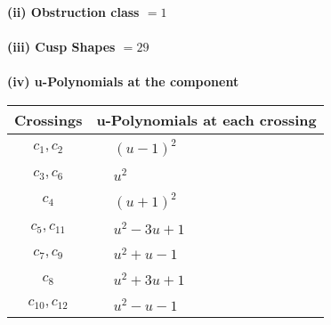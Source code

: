 \documentclass[1p]{elsarticle_modified}
\theoremstyle{definition}
\begin{document}
\flushleft \textbf{(ii) Obstruction class $= 1$}\\~\\
\flushleft \textbf{(iii) Cusp Shapes $= 29$}\\~\\
\newpage\renewcommand{\arraystretch}{1}
\flushleft \textbf{(iv) u-Polynomials at the component}\newline \\
\begin{tabular}{m{50pt}|m{274pt}}
Crossings & \hspace{64pt}u-Polynomials at each crossing \\
\hline $$\begin{aligned}c_{1},c_{2}\end{aligned}$$&$\begin{aligned}
&(u-1)^2
\end{aligned}$\\
\hline $$\begin{aligned}c_{3},c_{6}\end{aligned}$$&$\begin{aligned}
&u^2
\end{aligned}$\\
\hline $$\begin{aligned}c_{4}\end{aligned}$$&$\begin{aligned}
&(u+1)^2
\end{aligned}$\\
\hline $$\begin{aligned}c_{5},c_{11}\end{aligned}$$&$\begin{aligned}
&u^2-3 u+1
\end{aligned}$\\
\hline $$\begin{aligned}c_{7},c_{9}\end{aligned}$$&$\begin{aligned}
&u^2+u-1
\end{aligned}$\\
\hline $$\begin{aligned}c_{8}\end{aligned}$$&$\begin{aligned}
&u^2+3 u+1
\end{aligned}$\\
\hline $$\begin{aligned}c_{10},c_{12}\end{aligned}$$&$\begin{aligned}
&u^2- u-1
\end{aligned}$\\
\hline
\end{tabular}\\~\\
\end{document}
